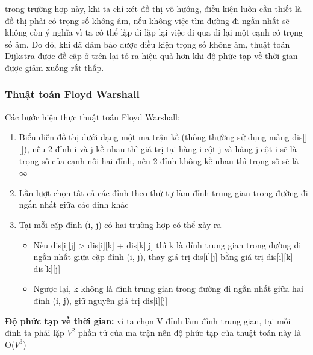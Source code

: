 \documentclass[a4paper]{article}
\begin{document}
trong trường hợp này, khi ta chỉ xét đồ thị vô hướng, điều kiện luôn cần thiết là đồ thị phải có trọng số không âm, nếu không việc tìm đường đi ngắn nhất sẽ không còn ý nghĩa vì ta có thể lặp đi lặp lại việc đi qua đi lại một cạnh có trọng số âm. Do đó, khi đã đảm bảo được điều kiện trọng số không âm, thuật toán Dijkstra được đề cập ở trên lại tỏ ra hiệu quả hơn khi độ phức tạp về thời gian được giảm xuống rất thấp.

\subsubsection{Thuật toán Floyd Warshall}

Các bước hiện thực thuật toán Floyd Warshall:
\begin{enumerate}
    \item Biểu diễn đồ thị dưới dạng một ma trận kề (thông thường sử dụng mảng dis[][]), nếu 2 đỉnh i và j kề nhau thì giá trị tại hàng i cột j và hàng j cột i sẽ là trọng số của cạnh nối hai đỉnh, nếu 2 đỉnh không kề nhau thì trọng số sẽ là \textbf{$\infty$}
    \item Lần lượt chọn tất cả các đỉnh theo thứ tự làm đỉnh trung gian trong đường đi ngắn nhất giữa các đỉnh khác
    \item Tại mỗi cặp đỉnh (i, j) có hai trường hợp có thể xảy ra
    \begin{itemize}
        \item Nếu dis[i][j] > dis[i][k] + dis[k][j] thì k là đỉnh trung gian trong đường đi ngắn nhất giữa cặp đỉnh (i, j), thay giá trị dis[i][j] bằng giá trị dis[i][k] + dis[k][j]
        \item Ngược lại, k không là đỉnh trung gian trong đường đi ngắn nhất giữa hai đỉnh (i, j), giữ nguyên giá trị dis[i][j]
    \end{itemize}
\end{enumerate}
\textbf{Độ phức tạp về thời gian:} vì ta chọn V đỉnh làm đỉnh trung gian, tại mỗi đỉnh ta phải lặp $V^2$ phần tử của ma trận nên độ phức tạp của thuật toán này là O($V^3$) \\
\end{document}
